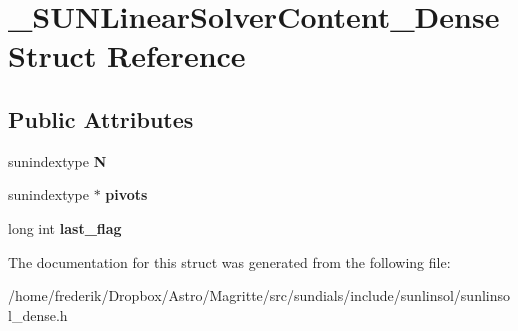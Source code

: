 \hypertarget{struct__SUNLinearSolverContent__Dense}{}\section{\+\_\+\+S\+U\+N\+Linear\+Solver\+Content\+\_\+\+Dense Struct Reference}
\label{struct__SUNLinearSolverContent__Dense}
\subsection*{Public Attributes}
\begin{DoxyCompactItemize}
\item 
\mbox{\label{struct__SUNLinearSolverContent__Dense_a6ff4f92bcaa8fd53ad3d138ef7ca4963}} 
sunindextype {\bfseries N}
\item 
\mbox{\label{struct__SUNLinearSolverContent__Dense_a6b4ad98fdc6f185abd7a400d481b4dee}} 
sunindextype $\ast$ {\bfseries pivots}
\item 
\mbox{\label{struct__SUNLinearSolverContent__Dense_a74b7283bc184eb6fb8336336d542d8b0}} 
long int {\bfseries last\+\_\+flag}
\end{DoxyCompactItemize}


The documentation for this struct was generated from the following file\+:\begin{DoxyCompactItemize}
\item 
/home/frederik/\+Dropbox/\+Astro/\+Magritte/src/sundials/include/sunlinsol/sunlinsol\+\_\+dense.\+h\end{DoxyCompactItemize}
